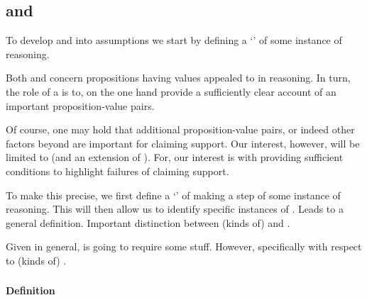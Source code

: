 \subsection{ and }
\label{sec:claim-supp-requ}

\begin{note}
  To develop \ideaS{} and \ideaCS{} into assumptions we start by defining a `\requ{}' of some instance of reasoning.

  Both \ideaS{} and \ideaCS{} concern propositions having values appealed to in reasoning.
  In turn, the role of a \requ{} is to, on the one hand provide a sufficiently clear account of an important proposition-value pairs.

  Of course, one may hold that additional proposition-value pairs, or indeed other factors beyond  are important for claiming support.
  Our interest, however, will be limited to  (and an extension of ).
  For, our interest is with providing sufficient conditions to highlight failures of claiming support.
\end{note}



\begin{note}
  To make this precise, we first define a `\result{}' of making a step of some instance of reasoning.
  This will then allow us to identify specific instances of .
  Leads to a general definition.
  Important distinction between (kinds of)  and .

  Given \requ{} in general, \ideaCS{} is going to require some stuff.
  However, specifically with respect to (kinds of) .
\end{note}

\subsubsection{}
\label{sec:def-of-result}

\paragraph{Definition}

